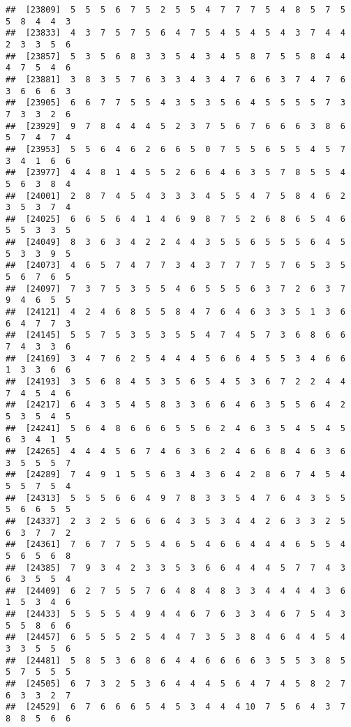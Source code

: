 \documentclass[
]{book}
\begin{document}
\begin{verbatim}
##  [23809]  5  5  5  6  7  5  2  5  5  4  7  7  7  5  4  8  5  7  5  5  8  4  4  3
##  [23833]  4  3  7  5  7  5  6  4  7  5  4  5  4  5  4  3  7  4  4  2  3  3  5  6
##  [23857]  5  3  5  6  8  3  3  5  4  3  4  5  8  7  5  5  8  4  4  4  7  5  4  6
##  [23881]  3  8  3  5  7  6  3  3  4  3  4  7  6  6  3  7  4  7  6  3  6  6  6  3
##  [23905]  6  6  7  7  5  5  4  3  5  3  5  6  4  5  5  5  5  7  3  7  3  3  2  6
##  [23929]  9  7  8  4  4  4  5  2  3  7  5  6  7  6  6  6  3  8  6  5  7  4  7  4
##  [23953]  5  5  6  4  6  2  6  6  5  0  7  5  5  6  5  5  4  5  7  3  4  1  6  6
##  [23977]  4  4  8  1  4  5  5  2  6  6  4  6  3  5  7  8  5  5  4  5  6  3  8  4
##  [24001]  2  8  7  4  5  4  3  3  3  4  5  5  4  7  5  8  4  6  2  3  5  3  7  4
##  [24025]  6  6  5  6  4  1  4  6  9  8  7  5  2  6  8  6  5  4  6  5  5  3  3  5
##  [24049]  8  3  6  3  4  2  2  4  4  3  5  5  6  5  5  5  6  4  5  5  3  3  9  5
##  [24073]  4  6  5  7  4  7  7  3  4  3  7  7  7  5  7  6  5  3  5  5  6  7  6  5
##  [24097]  7  3  7  5  3  5  5  4  6  5  5  5  6  3  7  2  6  3  7  9  4  6  5  5
##  [24121]  4  2  4  6  8  5  5  8  4  7  6  4  6  3  3  5  1  3  6  6  4  7  7  3
##  [24145]  5  5  7  5  3  5  3  5  5  4  7  4  5  7  3  6  8  6  6  7  4  3  3  6
##  [24169]  3  4  7  6  2  5  4  4  4  5  6  6  4  5  5  3  4  6  6  1  3  3  6  6
##  [24193]  3  5  6  8  4  5  3  5  6  5  4  5  3  6  7  2  2  4  4  7  4  5  4  6
##  [24217]  6  4  3  5  4  5  8  3  3  6  6  4  6  3  5  5  6  4  2  5  3  5  4  5
##  [24241]  5  6  4  8  6  6  6  5  5  6  2  4  6  3  5  4  5  4  5  6  3  4  1  5
##  [24265]  4  4  4  5  6  7  4  6  3  6  2  4  6  6  8  4  6  3  6  3  5  5  5  7
##  [24289]  7  4  9  1  5  5  6  3  4  3  6  4  2  8  6  7  4  5  4  5  5  7  5  4
##  [24313]  5  5  5  6  6  4  9  7  8  3  3  5  4  7  6  4  3  5  5  5  6  6  5  5
##  [24337]  2  3  2  5  6  6  6  4  3  5  3  4  4  2  6  3  3  2  5  6  3  7  7  2
##  [24361]  7  6  7  7  5  5  4  6  5  4  6  6  4  4  4  6  5  5  4  5  6  5  6  8
##  [24385]  7  9  3  4  2  3  3  5  3  6  6  4  4  4  5  7  7  4  3  6  3  5  5  4
##  [24409]  6  2  7  5  5  7  6  4  8  4  8  3  3  4  4  4  4  3  6  1  5  3  4  6
##  [24433]  5  5  5  5  4  9  4  4  6  7  6  3  3  4  6  7  5  4  3  5  5  8  6  6
##  [24457]  6  5  5  5  2  5  4  4  7  3  5  3  8  4  6  4  4  5  4  3  3  5  5  6
##  [24481]  5  8  5  3  6  8  6  4  4  6  6  6  6  3  5  5  3  8  5  5  7  5  5  5
##  [24505]  6  7  3  2  5  3  6  4  4  4  5  6  4  7  4  5  8  2  7  6  3  3  2  7
##  [24529]  6  7  6  6  6  5  4  5  3  4  4  4 10  7  5  6  4  3  7  8  8  5  6  6

\end{verbatim}
\end{document}
